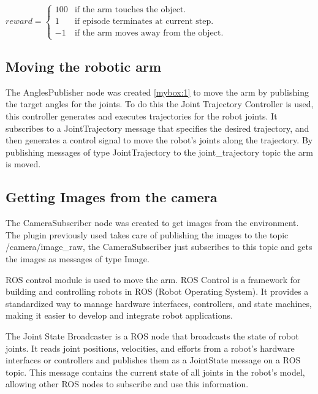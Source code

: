 \documentclass[12pt,oneside]{article}
\begin{document}
\begin{enumerate}
$reward = 
 \begin{cases} 
 	100 	& \text{if the arm touches the object.} \\ 
 	1 		& \text{if episode terminates at current step.} \\ 
 	-1 		& \text{if the arm moves away from the object.} 
 \end{cases}$
\end{enumerate}





\subsection{Moving the robotic arm}
The AnglesPublisher node was created \ref{mybox:1} to move the arm by publishing the target angles for the joints. To do this the Joint Trajectory Controller is used, this controller generates and executes trajectories for the robot joints. It subscribes to a JointTrajectory message that specifies the desired trajectory, and then generates a control signal to move the robot's joints along the trajectory. By publishing messages of type JointTrajectory to the joint\_trajectory topic the arm is moved.

\subsection{Getting Images from the camera}
The CameraSubscriber node was created to get images from the environment. The plugin previously used takes care of publishing the images to the topic /camera/image\_raw, the CameraSubscriber just subscribes to this topic and gets the images as messages of type Image.



ROS control module is used to move the arm. ROS Control is a framework for building and controlling robots in ROS (Robot Operating System). It provides a standardized way to manage hardware interfaces, controllers, and state machines, making it easier to develop and integrate robot applications.

The Joint State Broadcaster is a ROS node that broadcasts the state of robot joints. It reads joint positions, velocities, and efforts from a robot's hardware interfaces or controllers and publishes them as a JointState message on a ROS topic. This message contains the current state of all joints in the robot's model, allowing other ROS nodes to subscribe and use this information.
\end{document}
